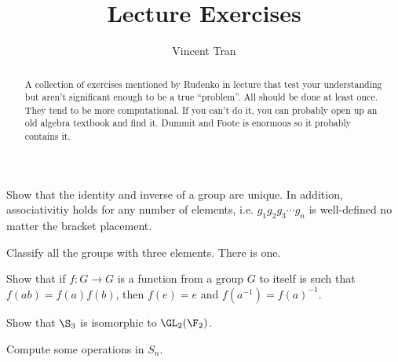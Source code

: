 \documentclass{amsart}
\title{Lecture Exercises}
\author{Vincent Tran}
\begin{document}
\begin{abstract}
	A collection of exercises mentioned by Rudenko in lecture that test your understanding but aren't significant enough to be a true ``problem''.
	All should be done at least once.
	They tend to be more computational.
	If you can't do it, you can probably open up an old algebra textbook and find it.
	Dummit and Foote is enormous so it probably contains it.
\end{abstract}

\maketitle

\begin{exercise}
	Show that the identity and inverse of a group are unique.
	In addition, associativitiy holds for any number of elements, i.e. $g_{1}g_{2}g_{3}\cdots g_n $ is well-defined no matter the bracket placement.
\end{exercise}

\begin{exercise}
	Classify all the groups with three elements.
	\ifhint
		There is one.
	\fi
\end{exercise}

\begin{exercise}
	Show that if $f: G\to G $ is a function from a group $G $ to itself is such that $f(ab) = f(a) f(b) $, then $f(e) = e $ and $f(a^{-1}) = f(a)^{-1} $.
\end{exercise}

\begin{exercise}
	Show that $\S_3 $ is isomorphic to $\GL_2(\F_2) $.
\end{exercise}

\begin{exercise}
	Compute some operations in $S_n $.
\end{exercise}
\end{document}
